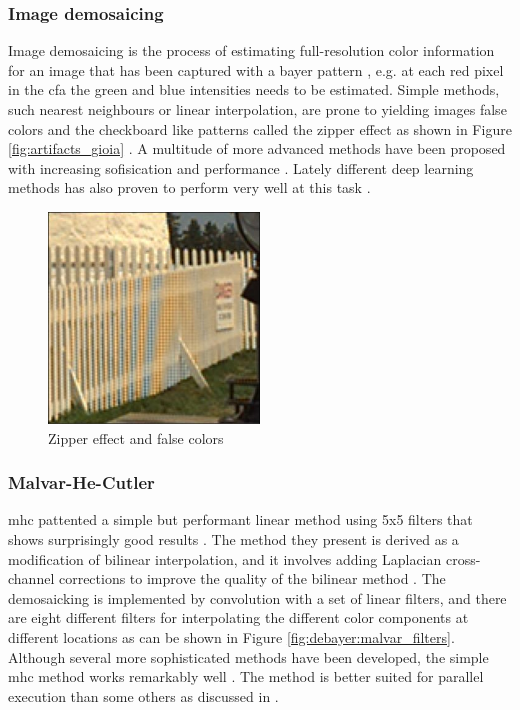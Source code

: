 \subsubsection{Image demosaicing}
Image demosaicing is the process of estimating full-resolution color information for an image that has been captured with a bayer pattern \cite{liImageDemosaicingSystematic2008}, e.g. at each red pixel in the \gls{cfa} the green and blue intensities needs to be estimated.
Simple methods, such nearest neighbours or linear interpolation, are prone to yielding images false colors and the checkboard like patterns called the zipper effect as shown in Figure \ref{fig:artifacts_gioia} \cite{gioiaDataDrivenConvolutionalModel2021} \cite{liImageDemosaicingSystematic2008}.
A multitude of more advanced methods have been proposed with increasing sofisication and performance \cite{liImageDemosaicingSystematic2008}.
Lately different deep learning methods has also proven to perform very well at this task \cite{kwanComparisonDeepLearning2019}.

\begin{figure}[H]
    \centering
    \includegraphics[width=0.5\textwidth]{figures/debayer/artifacts_gioia.png}
    \caption{Zipper effect and false colors \cite{gioiaDataDrivenConvolutionalModel2021}}
    \label{fig:artifacts_gioioa}
\end{figure}

\subsubsection{Malvar-He-Cutler}
\gls{mhc} pattented a simple but performant linear method using 5x5 filters that shows surprisingly good results \cite{malvarHighqualityGradientcorrectedLinear2009}.
The method they present is derived as a modification of bilinear interpolation, and it involves adding Laplacian cross-channel corrections to improve the quality of the bilinear method \cite{getreuerMalvarHeCutlerLinearImage2011}.
The demosaicking is implemented by convolution with a set of linear filters, and there are eight different filters for interpolating the different color components at different locations as can be shown in Figure \ref{fig:debayer:malvar_filters}.
Although several more sophisticated methods have been developed, the simple \gls{mhc} method works remarkably well \cite{liImageDemosaicingSystematic2008}\cite{kwanComparisonDeepLearning2019}\cite{getreuerMalvarHeCutlerLinearImage2011}.
The method is better suited for parallel execution than some others as discussed in \todo.

